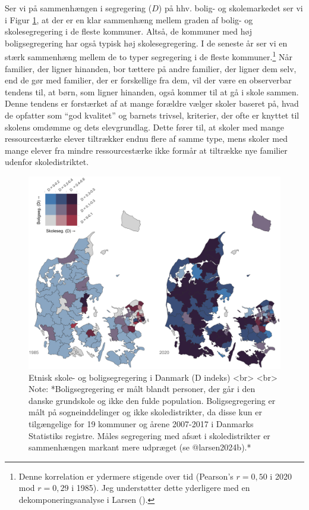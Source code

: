 \documentclass[
]{book}
\begin{document}
Ser vi på sammenhængen i segregering (\(D\)) på hhv. bolig- og skolemarkedet ser vi i Figur \ref{fig:fig-4-4}, at der er en klar sammenhæng mellem graden af bolig- og skolesegregering i de fleste kommuner. Altså, de kommuner med høj boligsegregering har også typisk høj skolesegregering. I de seneste år ser vi en stærk sammenhæng mellem de to typer segregering i de fleste kommuner.\footnote{Denne korrelation er ydermere stigende over tid (Pearson's \(r=0,50\) i 2020 mod \(r=0,29\) i 1985). Jeg understøtter dette yderligere med en dekomponeringsanalyse i Larsen ().} Når familier, der ligner hinanden, bor tættere på andre familier, der ligner dem selv, end de gør med familier, der er forskellige fra dem, vil der være en observerbar tendens til, at børn, som ligner hinanden, også kommer til at gå i skole sammen. Denne tendens er forstærket af at mange forældre vælger skoler baseret på, hvad de opfatter som ``god kvalitet'' og barnets trivsel, kriterier, der ofte er knyttet til skolens omdømme og dets elevgrundlag. Dette fører til, at skoler med mange ressourcestærke elever tiltrækker endnu flere af samme type, mens skoler med mange elever fra mindre ressourcestærke ikke formår at tiltrække nye familier udenfor skoledistriktet.

\begin{figure}
\includegraphics[width=1\linewidth]{images/Figur5} \caption{Etnisk skole- og boligsegregering i Danmark (D indeks) <br> <br> Note: *Boligsegregering er målt blandt personer, der går i den danske grundskole og ikke den fulde population. Boligsegregering er målt på sogneinddelinger og ikke skoledistrikter, da disse kun er tilgængelige for 19 kommuner og årene 2007-2017 i Danmarks Statistiks registre. Måles segregering med afsæt i skoledistrikter er sammenhængen markant mere udpræget (se @larsen2024b).*}\label{fig:fig-4-4}
\end{figure}
\end{document}

